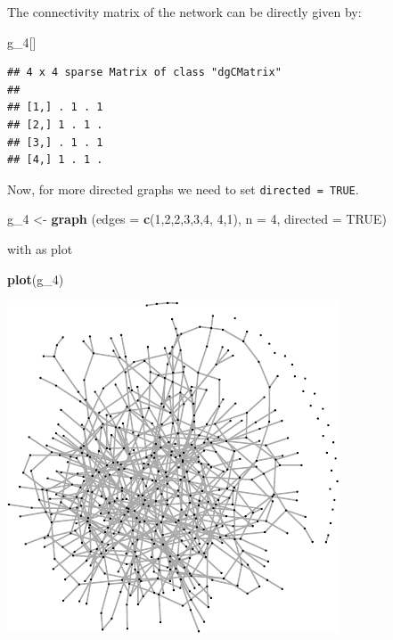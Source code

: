 \documentclass[]{article}
\newenvironment{Shaded}{\begin{snugshade}}{\end{snugshade}}
\newcommand{\KeywordTok}[1]{\textcolor[rgb]{0.13,0.29,0.53}{\textbf{#1}}}
\newcommand{\DataTypeTok}[1]{\textcolor[rgb]{0.13,0.29,0.53}{#1}}
\newcommand{\DecValTok}[1]{\textcolor[rgb]{0.00,0.00,0.81}{#1}}
\newcommand{\StringTok}[1]{\textcolor[rgb]{0.31,0.60,0.02}{#1}}
\newcommand{\OtherTok}[1]{\textcolor[rgb]{0.56,0.35,0.01}{#1}}
\newcommand{\NormalTok}[1]{#1}
\theoremstyle{definition}
\theoremstyle{definition}
\theoremstyle{definition}
\theoremstyle{remark}
\begin{document}
The connectivity matrix of the network can be directly given by:

\begin{Shaded}
\begin{Highlighting}[]
\NormalTok{g_}\DecValTok{4}\NormalTok{[]}
\end{Highlighting}
\end{Shaded}

\begin{verbatim}
## 4 x 4 sparse Matrix of class "dgCMatrix"
##             
## [1,] . 1 . 1
## [2,] 1 . 1 .
## [3,] . 1 . 1
## [4,] 1 . 1 .
\end{verbatim}

Now, for more directed graphs we need to set \texttt{directed\ =\ TRUE}.

\begin{Shaded}
\begin{Highlighting}[]
\NormalTok{g_}\DecValTok{4}\NormalTok{ <-}\StringTok{ }\KeywordTok{graph}\NormalTok{ (}\DataTypeTok{edges =} \KeywordTok{c}\NormalTok{(}\DecValTok{1}\NormalTok{,}\DecValTok{2}\NormalTok{,}\DecValTok{2}\NormalTok{,}\DecValTok{3}\NormalTok{,}\DecValTok{3}\NormalTok{,}\DecValTok{4}\NormalTok{, }\DecValTok{4}\NormalTok{,}\DecValTok{1}\NormalTok{), }\DataTypeTok{n =} \DecValTok{4}\NormalTok{, }\DataTypeTok{directed =} \OtherTok{TRUE}\NormalTok{)}
\end{Highlighting}
\end{Shaded}

with as plot

\begin{Shaded}
\begin{Highlighting}[]
\KeywordTok{plot}\NormalTok{(g_}\DecValTok{4}\NormalTok{)}
\end{Highlighting}
\end{Shaded}

\includegraphics{ResearchTools_files/figure-latex/unnamed-chunk-54-1.pdf}
\end{document}
